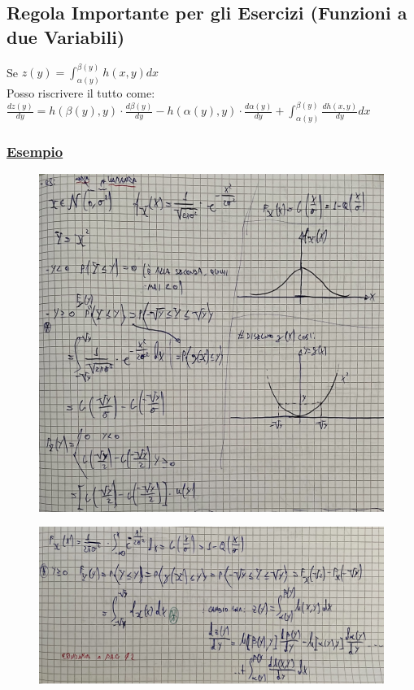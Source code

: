 \documentclass{article}
\begin{document}
\subsection{Regola Importante per gli Esercizi (Funzioni a due Variabili)}
Se $z(y) = \int_{\alpha(y)}^{\beta(y)} h(x,y) dx$ \\
Posso riscrivere il tutto come: \\
$\frac{dz(y)}{dy} = h \left( \beta(y), y\right) \cdot \frac{d\beta(y)}{dy} - h \left( \alpha(y), y\right) \cdot \frac{d\alpha(y)}{dy} + \int_{\alpha(y)}^{\beta(y)} \frac{dh(x,y)}{dy} dx$
\subsubsection{\underline{Esempio}}
\begin{figure}[ht]
\centering
\includegraphics[scale=0.14]{ese/17.jpeg}
\end{figure} 
\begin{figure}[ht]
\centering
\includegraphics[scale=0.11]{ese/17a.jpeg}
\end{figure} 
\end{document}
